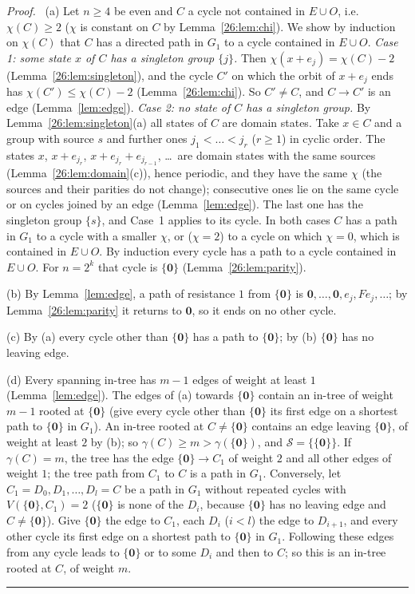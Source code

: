 \documentclass[10pt,a4paper]{article}
\newcommand{\qedmark}{\rule{1.1ex}{1.1ex}}
\newenvironment{proof}[1][Proof]{\par\smallskip\noindent\textit{#1.}\ }{\hfill\qedmark\par\smallskip}
\newcommand{\zero}{\mathbf{0}}                %
\newcommand{\Sel}{\mathcal{S}}                %
\newcommand{\Gone}{G_1}                       %
\begin{document}
\begin{proof}
(a) Let $n\ge4$ be even and $C$ a cycle not contained in $E\cup O$, i.e.\ $\chi(C)\ge2$ ($\chi$ is constant on $C$ by
Lemma~\ref{26:lem:chi}). We show by induction on $\chi(C)$ that $C$ has a directed path in $\Gone$ to a cycle
contained in $E\cup O$.
\emph{Case 1: some state $x$ of $C$ has a singleton group $\{j\}$.} Then $\chi(x+e_j)=\chi(C)-2$
(Lemma~\ref{26:lem:singleton}), and the cycle $C'$ on which the orbit of $x+e_j$ ends has $\chi(C')\le\chi(C)-2$
(Lemma~\ref{26:lem:chi}). So $C'\ne C$, and $C\to C'$ is an edge (Lemma~\ref{lem:edge}).
\emph{Case 2: no state of $C$ has a singleton group.} By Lemma~\ref{26:lem:singleton}(a) all states of $C$ are domain
states. Take $x\in C$ and a group with source $s$ and further ones $j_1<\dots<j_r$ ($r\ge1$) in cyclic order. The
states $x$, $x+e_{j_r}$, $x+e_{j_r}+e_{j_{r-1}}$, \dots\ are domain states with the same sources
(Lemma~\ref{26:lem:domain}(c)), hence periodic, and they have the same $\chi$ (the sources and their parities do not
change); consecutive ones lie on the same cycle or on cycles joined by an edge
(Lemma~\ref{lem:edge}). The last one has the singleton group $\{s\}$, and Case~1 applies to its cycle.
In both cases $C$ has a path in $\Gone$ to a cycle with a smaller $\chi$, or ($\chi=2$) to a cycle on which $\chi=0$,
which is contained in $E\cup O$. By induction every cycle has a path to a cycle contained in $E\cup O$. For $n=2^k$
that cycle is $\{\zero\}$ (Lemma~\ref{26:lem:parity}).

(b) By Lemma~\ref{lem:edge}, a path of resistance $1$ from $\{\zero\}$ is $\zero,\dots,\zero,e_j,Fe_j,\dots$; by
Lemma~\ref{26:lem:parity} it returns to $\zero$, so it ends on no other cycle.

(c) By (a) every cycle other than $\{\zero\}$ has a path to $\{\zero\}$; by (b) $\{\zero\}$ has no leaving edge.

(d) Every spanning in-tree has $m-1$ edges of weight at least $1$ (Lemma~\ref{lem:edge}). The edges of (a) towards
$\{\zero\}$ contain an in-tree of weight $m-1$ rooted at $\{\zero\}$ (give every cycle other than $\{\zero\}$ its
first edge on a shortest path to $\{\zero\}$ in $\Gone$). An in-tree rooted at $C\ne\{\zero\}$ contains an edge leaving
$\{\zero\}$, of weight at least $2$ by (b); so $\gamma(C)\ge m>\gamma(\{\zero\})$, and $\Sel=\{\{\zero\}\}$. If
$\gamma(C)=m$, the tree has the edge $\{\zero\}\to C_1$ of weight $2$ and all other edges of weight $1$; the tree path
from $C_1$ to $C$ is a path in $\Gone$. Conversely, let $C_1=D_0,D_1,\dots,D_l=C$ be a path in $\Gone$ without
repeated cycles with $V(\{\zero\},C_1)=2$ ($\{\zero\}$ is none of the $D_i$, because $\{\zero\}$ has no leaving edge
and $C\ne\{\zero\}$). Give $\{\zero\}$ the edge to $C_1$, each $D_i$ ($i<l$) the edge to $D_{i+1}$, and every other
cycle its first edge on a shortest path to $\{\zero\}$ in $\Gone$. Following these edges from any cycle leads to
$\{\zero\}$ or to some $D_i$ and then to $C$; so this is an in-tree rooted at $C$, of weight $m$.
\end{proof}
\end{document}
